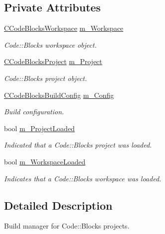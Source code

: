 \subsection*{Private Attributes}
\begin{DoxyCompactItemize}
\item 
\hyperlink{classCCodeBlocksWorkspace}{C\-Code\-Blocks\-Workspace} \hyperlink{classCCodeBlocksBuildManager_a7affd9de7002a93d1682986cd9236b6b}{m\-\_\-\-Workspace}
\begin{DoxyCompactList}\small\item\em Code\-::\-Blocks workspace object. \end{DoxyCompactList}\item 
\hyperlink{classCCodeBlocksProject}{C\-Code\-Blocks\-Project} \hyperlink{classCCodeBlocksBuildManager_a70ffda777a7fda5cd18a1a97ad7871b7}{m\-\_\-\-Project}
\begin{DoxyCompactList}\small\item\em Code\-::\-Blocks project object. \end{DoxyCompactList}\item 
\hyperlink{classCCodeBlocksBuildConfig}{C\-Code\-Blocks\-Build\-Config} \hyperlink{classCCodeBlocksBuildManager_abda268cd01673d4a1fec14a73c4f8914}{m\-\_\-\-Config}
\begin{DoxyCompactList}\small\item\em Build configuration. \end{DoxyCompactList}\item 
bool \hyperlink{classCCodeBlocksBuildManager_a347f43f610f53350c6721b3613bfa68b}{m\-\_\-\-Project\-Loaded}
\begin{DoxyCompactList}\small\item\em Indicated that a Code\-::\-Blocks project was loaded. \end{DoxyCompactList}\item 
bool \hyperlink{classCCodeBlocksBuildManager_ac85e500d80e44926bf0471466d21ad6c}{m\-\_\-\-Workspace\-Loaded}
\begin{DoxyCompactList}\small\item\em Indicates that a Code\-::\-Blocks workspace was loaded. \end{DoxyCompactList}\end{DoxyCompactItemize}


\subsection{Detailed Description}
Build manager for Code\-::\-Blocks projects. 

